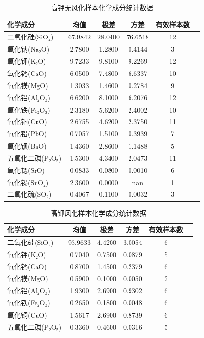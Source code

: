 \documentclass[withoutpreface,bwprint]{cumcmthesis}
\begin{document}
\begin{table}[htbp]
    \centering
    \caption{高钾无风化样本化学成分统计数据}
    \begin{tabular}{lccccc}
        \hline
        化学成分 & 均值 & 极差 & 方差 & 有效样本数 \\
        \hline
        二氧化硅(SiO₂) & 67.9842 & 28.0400 & 76.6518 & 12 \\
        氧化钠(Na₂O) & 2.7800 & 1.2800 & 0.4144 & 3 \\
        氧化钾(K₂O) & 9.7233 & 9.8100 & 9.2269 & 12 \\
        氧化钙(CaO) & 6.0500 & 7.4800 & 6.6337 & 10 \\
        氧化镁(MgO) & 1.3033 & 1.4600 & 0.2784 & 9 \\
        氧化铝(Al₂O₃) & 6.6200 & 8.1000 & 6.2076 & 12 \\
        氧化铁(Fe₂O₃) & 2.3180 & 5.6200 & 2.4002 & 10 \\
        氧化铜(CuO) & 2.6755 & 4.6200 & 2.3750 & 11 \\
        氧化铅(PbO) & 0.7057 & 1.5100 & 0.3939 & 7 \\
        氧化钡(BaO) & 1.4360 & 2.8600 & 1.1488 & 5 \\
        五氧化二磷(P₂O₅) & 1.5300 & 4.3400 & 2.0473 & 11 \\
        氧化锶(SrO) & 0.0833 & 0.0800 & 0.0010 & 6 \\
        氧化锡(SnO₂) & 2.3600 & 0.0000 & nan & 1 \\
        二氧化硫(SO₂) & 0.4067 & 0.1100 & 0.0032 & 3 \\
        \hline
    \end{tabular}
\end{table}

\begin{table}[htbp]
    \centering
    \caption{高钾风化样本化学成分统计数据}
    \begin{tabular}{lccccc}
        \hline
        化学成分 & 均值 & 极差 & 方差 & 有效样本数 \\
        \hline
        二氧化硅(SiO₂) & 93.9633 & 4.4200 & 3.0054 & 6 \\
        氧化钾(K₂O) & 0.7040 & 0.7500 & 0.0879 & 5 \\
        氧化钙(CaO) & 0.8700 & 1.4500 & 0.2379 & 6 \\
        氧化镁(MgO) & 0.5900 & 0.1000 & 0.0050 & 2 \\
        氧化铝(Al₂O₃) & 1.9300 & 2.6900 & 0.9302 & 6 \\
        氧化铁(Fe₂O₃) & 0.2650 & 0.1800 & 0.0048 & 6 \\
        氧化铜(CuO) & 1.5617 & 2.6900 & 0.8739 & 6 \\
        五氧化二磷(P₂O₅) & 0.3360 & 0.4600 & 0.0316 & 5 \\
        \hline
    \end{tabular}
\end{table}
\end{document}
